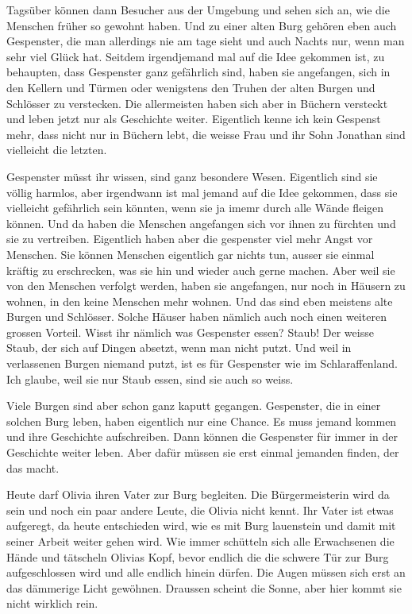 Tagsüber können dann Besucher aus der Umgebung und sehen sich an, wie die Menschen früher so gewohnt haben. Und zu einer alten Burg gehören eben auch Gespenster, die man allerdings nie am tage sieht und auch Nachts nur, wenn man sehr viel Glück hat. Seitdem irgendjemand mal auf die Idee gekommen ist, zu behaupten, dass Gespenster ganz gefährlich sind, haben sie angefangen, sich in den Kellern und Türmen oder wenigstens den Truhen der alten Burgen und Schlösser zu verstecken. Die allermeisten haben sich aber in Büchern versteckt und leben jetzt nur als Geschichte weiter. Eigentlich kenne ich kein Gespenst mehr, dass nicht nur in Büchern lebt, die weisse Frau und ihr Sohn Jonathan sind vielleicht die letzten.
\medskip
\begin{mdframed}[style=mystyle]
Gespenster müsst ihr wissen, sind ganz besondere Wesen. Eigentlich sind sie völlig harmlos, aber irgendwann ist mal jemand auf die Idee gekommen, dass sie vielleicht gefährlich sein könnten, wenn sie ja imemr durch alle Wände fleigen können. Und da haben die Menschen angefangen sich vor ihnen zu fürchten und sie zu vertreiben. Eigentlich haben aber die gespenster viel mehr Angst vor Menschen. Sie können Menschen eigentlich gar nichts tun, ausser sie einmal kräftig zu erschrecken, was sie hin und wieder auch gerne machen. Aber weil sie von den Menschen verfolgt werden, haben sie angefangen, nur noch in Häusern zu wohnen, in den keine Menschen mehr wohnen. Und das sind eben meistens alte Burgen und Schlösser. Solche Häuser haben nämlich auch noch einen weiteren grossen Vorteil. Wisst ihr nämlich was Gespenster essen? Staub! Der weisse Staub, der sich auf Dingen absetzt, wenn man nicht putzt. Und weil in verlassenen Burgen niemand putzt, ist es für Gespenster wie im Schlaraffenland. Ich glaube, weil sie nur Staub essen, sind sie auch so weiss.

Viele Burgen sind aber schon ganz kaputt gegangen. Gespenster, die in einer solchen Burg leben, haben eigentlich nur eine Chance. Es muss jemand kommen und ihre Geschichte aufschreiben. Dann können die Gespenster für immer in der Geschichte weiter leben. Aber dafür müssen sie erst einmal jemanden finden, der das macht.
\end{mdframed}\medskip

Heute darf Olivia ihren Vater zur Burg begleiten. Die Bürgermeisterin wird da sein und noch ein paar andere Leute, die Olivia nicht kennt. Ihr Vater ist etwas aufgeregt, da heute entschieden wird, wie es mit Burg lauenstein und damit mit seiner Arbeit weiter gehen wird. Wie immer schütteln sich alle Erwachsenen die Hände und tätscheln Olivias Kopf, bevor endlich die die schwere Tür zur Burg aufgeschlossen wird und alle endlich hinein dürfen. Die Augen müssen sich erst an das dämmerige Licht gewöhnen. Draussen scheint die Sonne, aber hier kommt sie nicht wirklich rein.

